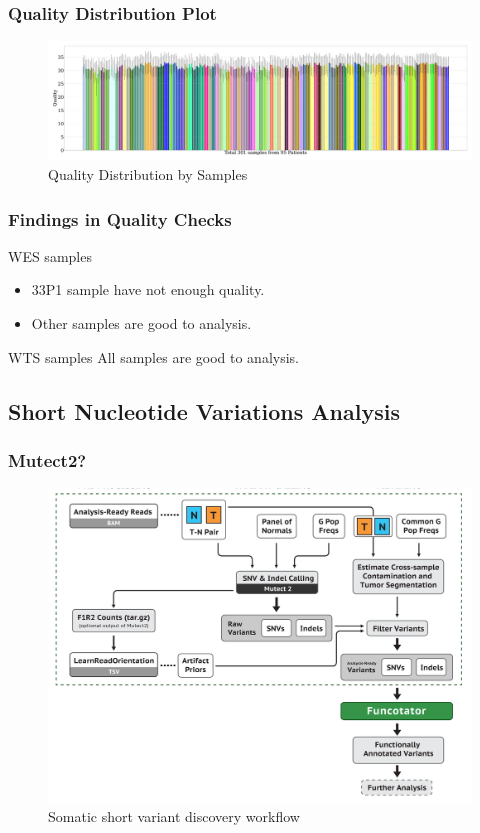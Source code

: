 \documentclass{beamer}
\begin{document}
    \begin{frame}
        \frametitle{Quality Distribution Plot}

        \begin{figure}
            \includegraphics[width=\linewidth]{figures/CollectMultipleMetrics/BWA.pdf}
            \caption{Quality Distribution by Samples}
        \end{figure}
    \end{frame}

    \begin{frame}
        \frametitle{Findings in Quality Checks}

        \begin{alertblock}{WES samples}
            \begin{itemize}
                \item 33P1 sample have not enough quality.
                \item Other samples are good to analysis.
            \end{itemize}
        \end{alertblock}

        \begin{exampleblock}{WTS samples}
            All samples are good to analysis.
        \end{exampleblock}
    \end{frame}

    \subsection{Short Nucleotide Variations Analysis}
    \begin{frame}
        \frametitle{Mutect2?}

        \begin{figure}
            \includegraphics[width=0.6 \linewidth]{figures/Workflow/somatic_short_variants.png}
            \caption{Somatic short variant discovery workflow \protect\cite{gatk1, gatk2}}
        \end{figure}
    \end{frame}
\end{document}
